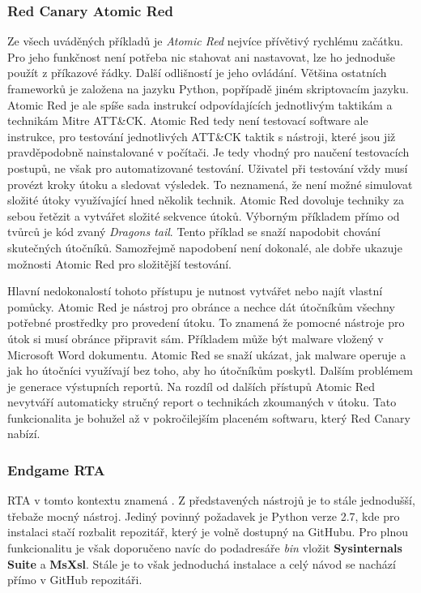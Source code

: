 \subsubsection{Red Canary Atomic Red}%
Ze všech uváděných příkladů je \textit{Atomic Red} nejvíce přívětivý rychlému začátku.
Pro jeho funkčnost není potřeba nic stahovat ani nastavovat, lze ho jednoduše použít z příkazové řádky\cite{redcanary_atomic_red}.
Další odlišností je jeho ovládání.
Většina ostatních frameworků je založena na jazyku Python, popřípadě jiném skriptovacím jazyku.
Atomic Red je ale spíše sada instrukcí odpovídajících jednotlivým taktikám a technikám Mitre ATT\&CK\@.
Atomic Red tedy není testovací software ale instrukce, pro testování jednotlivých ATT\&CK taktik s nástroji, které jsou již pravděpodobně nainstalované v počítači.
Je tedy vhodný pro naučení testovacích postupů, ne však pro automatizované testování.
Uživatel při testování vždy musí provézt kroky útoku a sledovat výsledek.
To neznamená, že není možné simulovat složité útoky využívající hned několik technik.
Atomic Red dovoluje techniky za sebou řetězit a vytvářet složité sekvence útoků.
Výborným příkladem přímo od tvůrců je kód zvaný \textit{Dragons tail}\cite{redcanary_dragons_tail}.
Tento příklad se snaží napodobit chování skutečných útočníků.
Samozřejmě napodobení není dokonalé, ale dobře ukazuje možnosti Atomic Red pro složitější testování.\cite{csoonline_4_testing_frameworks}

Hlavní nedokonalostí tohoto přístupu je nutnost vytvářet nebo najít vlastní pomůcky.
Atomic Red je nástroj pro obránce a nechce dát útočníkům všechny potřebné prostředky pro provedení útoku.
To znamená že pomocné nástroje pro útok si musí obránce připravit sám.
Příkladem může být malware vložený v Microsoft Word dokumentu.
Atomic Red se snaží ukázat, jak malware operuje a jak ho útočníci využívají bez toho, aby ho útočníkům poskytl.
Dalším problémem je generace výstupních reportů.
Na rozdíl od dalších přístupů Atomic Red nevytváří automaticky stručný report o technikách zkoumaných v útoku.
Tato funkcionalita je bohužel až v pokročilejším placeném softwaru, který Red Canary nabízí.\cite{csoonline_4_testing_frameworks}


\subsubsection{Endgame RTA}
\ac{RTA} v tomto kontextu znamená .
Z představených nástrojů je to stále jednodušší, třebaže mocný nástroj.
Jediný povinný požadavek je Python verze 2.7, kde pro instalaci stačí rozbalit repozitář, který je volně dostupný na GitHubu.
Pro plnou funkcionalitu je však doporučeno navíc do podadresáře \textit{bin} vložit \textbf{Sysinternals Suite} a \textbf{MsXsl}.
Stále je to však jednoduchá instalace a celý návod se nachází přímo v GitHub repozitáři.\cite{endgame_rta}

